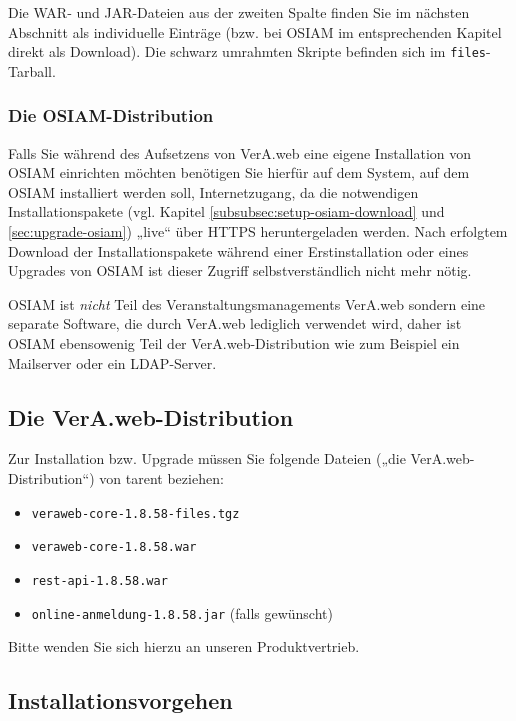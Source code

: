 \documentclass{tarentanleitung}
\newcommand{\vwiaverssw}{1.8.58}
\begin{document}
Die WAR‑ und JAR-Dateien aus der zweiten Spalte finden Sie im
nächsten Abschnitt als individuelle Einträge (bzw. bei OSIAM
im entsprechenden Kapitel direkt als Download). Die schwarz
umrahmten Skripte befinden sich im \texttt{files}-Tarball.

\subsubsection{Die OSIAM-Distribution}\label{subsubsec:intro-distro-ong}

Falls Sie während des Aufsetzens von VerA.web eine eigene Installation
von OSIAM einrichten möchten benötigen Sie hierfür auf dem System, auf
dem OSIAM installiert werden soll, Internetzugang, da die notwendigen
Installationspakete (vgl. Kapitel \ref{subsubsec:setup-osiam-download} und
\ref{sec:upgrade-osiam}) „live“ über HTTPS heruntergeladen werden. Nach
erfolgtem Download der Installationspakete während einer Erstinstallation
oder eines Upgrades von OSIAM ist dieser Zugriff selbstverständlich nicht
mehr nötig.

OSIAM ist \emph{nicht} Teil des Veranstaltungsmanagements VerA.web sondern
eine separate Software, die durch VerA.web lediglich verwendet wird, daher
ist OSIAM ebensowenig Teil der VerA.web-Distribution wie zum Beispiel ein
Mailserver oder ein LDAP-Server.

\subsection{Die VerA.web-Distribution}\label{subsec:intro-distro}

Zur Installation bzw. Upgrade müssen Sie folgende Dateien („die
VerA.web-Distribution“) von tarent beziehen:\keinumbruch

\begin{itemize}
 \item{\texttt{veraweb-core-\vwiaverssw{}-files.tgz}}
 \item{\texttt{veraweb-core-\vwiaverssw{}.war}}
 \item{\texttt{rest-api-\vwiaverssw{}.war}}
 \item{\texttt{online-anmeldung-\vwiaverssw{}.jar} (falls gewünscht)}
\end{itemize}

Bitte wenden Sie sich hierzu an unseren Produktvertrieb.

\subsection{Installationsvorgehen}\label{subsec:intro-install}
\end{document}
